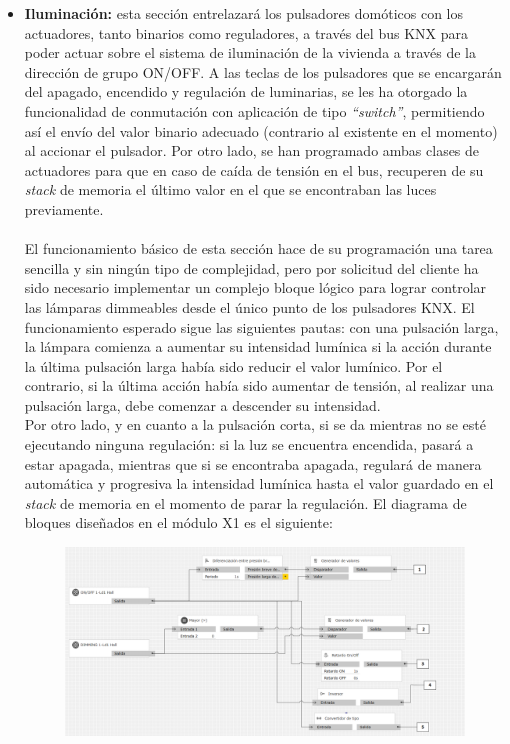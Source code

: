 \begin{itemize}
\item  \textbf{Iluminación:} esta sección entrelazará los pulsadores domóticos con los actuadores, tanto binarios como reguladores, a través del bus KNX para poder actuar sobre el sistema de iluminación de la vivienda a través de la dirección de grupo ON/OFF. A las teclas de los pulsadores que se encargarán del apagado, encendido y regulación de luminarias, se les ha otorgado la funcionalidad de conmutación con aplicación de tipo \textit {“switch”}, permitiendo así el envío del valor binario adecuado (contrario al existente en el momento) al accionar el pulsador. Por otro lado, se han programado ambas clases de actuadores para que en caso de caída de tensión en el bus, recuperen de su \textit {stack} de memoria el último valor en el que se encontraban las luces previamente. \\\\
El funcionamiento básico de esta sección hace de su programación una tarea sencilla y sin ningún tipo de complejidad, pero por solicitud del cliente ha sido necesario implementar un complejo bloque lógico para lograr controlar las lámparas dimmeables desde el único punto de los pulsadores KNX. El funcionamiento esperado sigue las siguientes pautas: con una pulsación larga, la lámpara comienza a aumentar su intensidad lumínica si la acción durante la última pulsación larga había sido reducir el valor lumínico. Por el contrario, si la última acción había sido aumentar de tensión, al realizar una pulsación larga, debe comenzar a descender su intensidad. \\
Por otro lado, y en cuanto a la pulsación corta, si se da mientras no se esté ejecutando ninguna regulación: si la luz se encuentra encendida, pasará a estar apagada, mientras que si se encontraba apagada, regulará de manera automática y progresiva la intensidad lumínica hasta el valor guardado en el \textit {stack} de memoria en el momento de parar la regulación.
\newpage
 El diagrama de bloques diseñados en el módulo X1 es el siguiente:
 \begin{center}
\begin{figure}[H]
\includegraphics[width=1.05\textwidth]{figures/log_dimm_izq.png}   

\end{figure}
\end{center}
\end{itemize}
